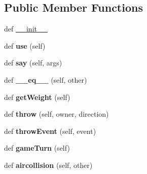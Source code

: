\subsection*{Public Member Functions}
\begin{DoxyCompactItemize}
\item 
def \hyperlink{classitems_1_1_item_ae3de3fd45b979ded986138a71d80441d}{\+\_\+\+\_\+init\+\_\+\+\_\+}
\item 
\hypertarget{classitems_1_1_item_adef3ba0298ba7345eadea2bb776edfe9}{}def {\bfseries use} (self)\label{classitems_1_1_item_adef3ba0298ba7345eadea2bb776edfe9}

\item 
\hypertarget{classitems_1_1_item_a5b4e0b576ce4dac2031c9c3b2d6140e1}{}def {\bfseries say} (self, args)\label{classitems_1_1_item_a5b4e0b576ce4dac2031c9c3b2d6140e1}

\item 
\hypertarget{classitems_1_1_item_a401a88231e01b131d27c410996734f6c}{}def {\bfseries \+\_\+\+\_\+eq\+\_\+\+\_\+} (self, other)\label{classitems_1_1_item_a401a88231e01b131d27c410996734f6c}

\item 
\hypertarget{classitems_1_1_item_a7e80e9908e2a7cfff8e8f1bb8ca060a2}{}def {\bfseries get\+Weight} (self)\label{classitems_1_1_item_a7e80e9908e2a7cfff8e8f1bb8ca060a2}

\item 
\hypertarget{classitems_1_1_item_aa729c1ff69df390a0564b06e498ca213}{}def {\bfseries throw} (self, owner, direction)\label{classitems_1_1_item_aa729c1ff69df390a0564b06e498ca213}

\item 
\hypertarget{classitems_1_1_item_adaea6b467affcc07d421008bf42330a0}{}def {\bfseries throw\+Event} (self, event)\label{classitems_1_1_item_adaea6b467affcc07d421008bf42330a0}

\item 
\hypertarget{classitems_1_1_item_aa25d9560ac3b920b5eb77dd4a62b3cc1}{}def {\bfseries game\+Turn} (self)\label{classitems_1_1_item_aa25d9560ac3b920b5eb77dd4a62b3cc1}

\item 
\hypertarget{classitems_1_1_item_ab0fd260891814b0dfce25a1566293ae9}{}def {\bfseries aircollision} (self, other)\label{classitems_1_1_item_ab0fd260891814b0dfce25a1566293ae9}

\end{DoxyCompactItemize}
